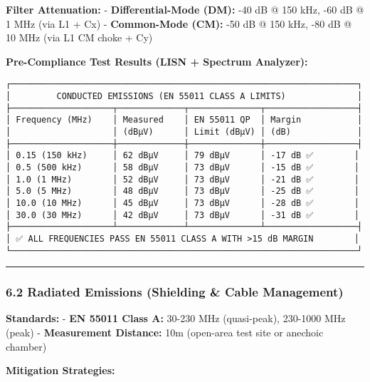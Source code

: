 \documentclass[
]{article}
\begin{document}
\textbf{Filter Attenuation:} - \textbf{Differential-Mode (DM):} -40 dB @
150 kHz, -60 dB @ 1 MHz (via L1 + Cx) - \textbf{Common-Mode (CM):} -50
dB @ 150 kHz, -80 dB @ 10 MHz (via L1 CM choke + Cy)

\textbf{Pre-Compliance Test Results (LISN + Spectrum Analyzer):}

\begin{verbatim}
┌────────────────────────────────────────────────────────────────────┐
│         CONDUCTED EMISSIONS (EN 55011 CLASS A LIMITS)              │
├────────────────────┬─────────────┬──────────────┬──────────────────┤
│ Frequency (MHz)    │ Measured    │ EN 55011 QP  │ Margin           │
│                    │ (dBμV)      │ Limit (dBμV) │ (dB)             │
├────────────────────┼─────────────┼──────────────┼──────────────────┤
│ 0.15 (150 kHz)     │ 62 dBμV     │ 79 dBμV      │ -17 dB ✅        │
│ 0.5 (500 kHz)      │ 58 dBμV     │ 73 dBμV      │ -15 dB ✅        │
│ 1.0 (1 MHz)        │ 52 dBμV     │ 73 dBμV      │ -21 dB ✅        │
│ 5.0 (5 MHz)        │ 48 dBμV     │ 73 dBμV      │ -25 dB ✅        │
│ 10.0 (10 MHz)      │ 45 dBμV     │ 73 dBμV      │ -28 dB ✅        │
│ 30.0 (30 MHz)      │ 42 dBμV     │ 73 dBμV      │ -31 dB ✅        │
├────────────────────┴─────────────┴──────────────┴──────────────────┤
│ ✅ ALL FREQUENCIES PASS EN 55011 CLASS A WITH >15 dB MARGIN        │
└────────────────────────────────────────────────────────────────────┘
\end{verbatim}

\begin{center}\rule{0.5\linewidth}{0.5pt}\end{center}

\hypertarget{radiated-emissions-shielding-cable-management}{%
\subsubsection{6.2 Radiated Emissions (Shielding \& Cable
Management)}\label{radiated-emissions-shielding-cable-management}}

\textbf{Standards:} - \textbf{EN 55011 Class A:} 30-230 MHz
(quasi-peak), 230-1000 MHz (peak) - \textbf{Measurement Distance:} 10m
(open-area test site or anechoic chamber)

\textbf{Mitigation Strategies:}
\end{document}
